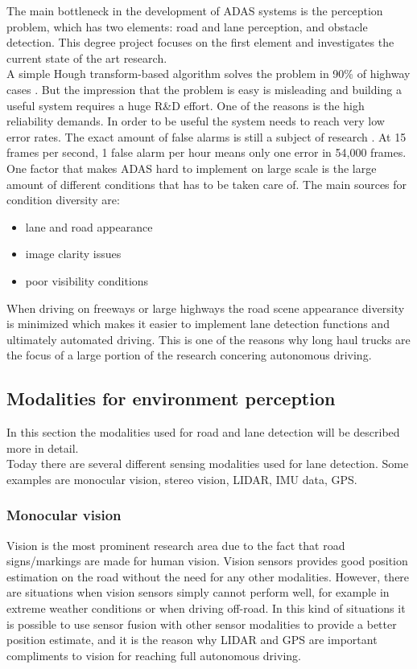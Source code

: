 The main bottleneck in the development of ADAS systems is the perception problem, which has two elements: road and lane perception, and obstacle detection. This degree project focuses on the first element and investigates the current state of the art research.\\

A simple Hough transform-based algorithm solves the problem in 90\% of highway cases \cite{BarHillel2014}. 
But the impression that the problem is easy is misleading and building a useful system requires a huge R\&{D} effort. One of the reasons is the high reliability demands. In order to be useful the system needs to reach very low error rates. The exact amount of false alarms is still a subject of research \cite{BarHillel2014}.
At 15 frames per second, 1 false alarm per hour means only one error in 54,000 frames.\\

One factor that makes ADAS hard to implement on large scale is the large amount of different conditions that has to be taken care of. The main sources for condition diversity are:
\begin{itemize}  
\item lane and road appearance
\item image clarity issues
\item poor visibility conditions
\end{itemize}


When driving on freeways or large highways the road scene appearance diversity is minimized which makes it easier to implement lane detection functions and ultimately automated driving. This is one of the reasons why long haul trucks are the focus of a large portion of the research concering autonomous driving. 

\subsection{Modalities for environment perception}
In this section the modalities used for road and lane detection will be described more in detail.\\

Today there are several different sensing modalities used for lane detection. Some examples are monocular vision, stereo vision, LIDAR, IMU data, GPS.\\

\subsubsection{Monocular vision}
Vision is the most prominent research area due to the fact that road signs/markings are made for human vision. Vision sensors provides good position estimation on the road without the need for any other modalities. However, there are situations when vision sensors simply cannot perform well, for example in extreme weather conditions or when driving off-road. In this kind of situations it is possible to use sensor fusion with other sensor modalities to provide a better position estimate, and it is the reason why LIDAR and GPS are important compliments to vision for reaching full autonomous driving.\\

